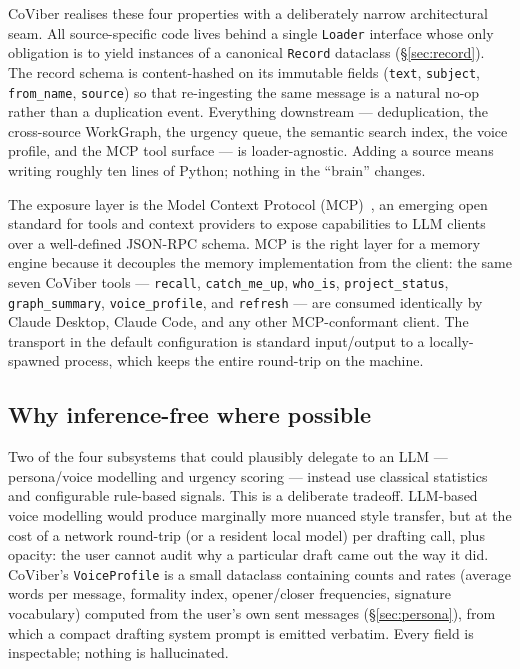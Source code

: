 CoViber realises these four properties with a deliberately narrow architectural
seam. All source-specific code lives behind a single \texttt{Loader} interface
whose only obligation is to yield instances of a canonical \texttt{Record}
dataclass (\S\ref{sec:record}). The record schema is content-hashed on its
immutable fields (\texttt{text}, \texttt{subject}, \texttt{from\_name},
\texttt{source}) so that re-ingesting the same message is a natural
no-op rather than a duplication event. Everything downstream --- deduplication,
the cross-source WorkGraph, the urgency queue, the semantic search index, the
voice profile, and the MCP tool surface --- is loader-agnostic. Adding a source
means writing roughly ten lines of Python; nothing in the ``brain'' changes.

The exposure layer is the Model Context Protocol (MCP)~\cite{TODO-mcp-spec}, an
emerging open standard for tools and context providers to expose capabilities
to LLM clients over a well-defined JSON-RPC schema. MCP is the right layer for a
memory engine because it decouples the memory implementation from the client:
the same seven CoViber tools --- \texttt{recall}, \texttt{catch\_me\_up},
\texttt{who\_is}, \texttt{project\_status}, \texttt{graph\_summary},
\texttt{voice\_profile}, and \texttt{refresh} --- are consumed identically by
Claude Desktop, Claude Code, and any other MCP-conformant client. The transport
in the default configuration is standard input/output to a locally-spawned
process, which keeps the entire round-trip on the machine.

\subsection{Why inference-free where possible}

Two of the four subsystems that could plausibly delegate to an LLM ---
persona/voice modelling and urgency scoring --- instead use classical statistics
and configurable rule-based signals. This is a deliberate tradeoff. LLM-based
voice modelling would produce marginally more nuanced style transfer, but at
the cost of a network round-trip (or a resident local model) per drafting
call, plus opacity: the user cannot audit why a particular draft came out the
way it did. CoViber's \texttt{VoiceProfile} is a small dataclass containing
counts and rates (average words per message, formality index, opener/closer
frequencies, signature vocabulary) computed from the user's own sent messages
(\S\ref{sec:persona}), from which a compact drafting system prompt is emitted
verbatim. Every field is inspectable; nothing is hallucinated.

